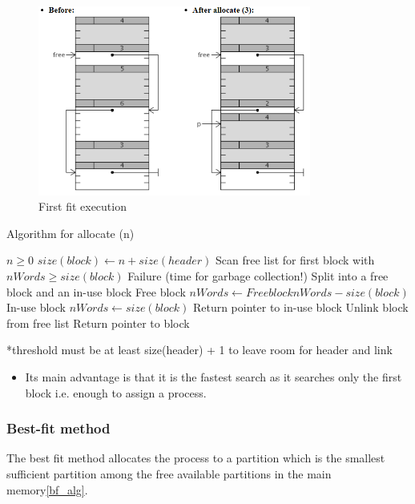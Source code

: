 \begin{figure}[htbp]
    \begin{center}
        \includegraphics[width=0.8\textwidth]{figures/FF_alg}
    \caption{First fit execution }
    \label{ff_alg}
    \end{center}
\end{figure}

\begin{algorithm}
\caption{Algorithm for allocate (n)}
\begin{algorithmic} 
\REQUIRE $n \geq 0$
\STATE $size(block) \leftarrow n + size(header)$  
\STATE Scan free list for first block with $nWords \geq size(block)$ 
  \STATE Failure (time for garbage collection!) 
   \STATE Split into a free block and an in-use block 
   \STATE Free block $nWords \leftarrow Free block nWords - size(block) $
   \STATE In-use block $nWords \leftarrow size(block) $
    \STATE Return pointer to in-use block 
\ELSE 
    \STATE Unlink block from free list 
    \STATE Return pointer to block 
\ENDIF
\end{algorithmic}
\end{algorithm}

*threshold must be at least size(header) + 1 to leave room for header and link \\

\begin{itemize}
\item Its main advantage is that it is the fastest search as it searches only the first block i.e. enough to assign a process.
\end{itemize}

\subsubsection{Best-fit method}
The best fit method allocates the process to a partition which is the smallest sufficient partition among the free available partitions in the main memory\ref{bf_alg}.

